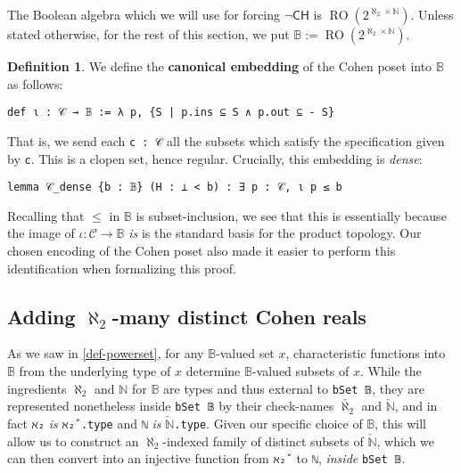 \documentclass[a4paper,USenglish,cleveref, autoref]{lipics-v2019}
\newcommand{\B}{\mathbb{B}}
\newcommand{\lil}{\lstinline}
\newcommand{\N}{\mathbb{N}}
\theoremstyle{definition}
\newtheorem{defn}[theorem]{Definition}
\begin{document}
The Boolean algebra which we will use for forcing $\neg\mathsf{CH}$ is $\operatorname{RO}(2^{\aleph_2 \times \mathbb{N}})$. Unless stated otherwise, for the rest of this section, we put $\B := \operatorname{RO}(2^{\aleph_2 \times \mathbb{N}})$.

\begin{defn}
  We define the \textbf{canonical embedding} of the Cohen poset into $\B$ as follows:
  \begin{lstlisting}
def ι : 𝒞 → 𝔹 := λ p, {S | p.ins ⊆ S ∧ p.out ⊆ - S}    
\end{lstlisting}
\end{defn}
That is, we send each \lil{c : 𝒞} all the subsets which satisfy the specification given by \lil{c}. This is a clopen set, hence regular. Crucially, this embedding is \emph{dense}:
\begin{lstlisting}
lemma 𝒞_dense {b : 𝔹} (H : ⊥ < b) : ∃ p : 𝒞, ι p ≤ b  
\end{lstlisting}
Recalling that $\leq$ in $\B$ is subset-inclusion, we see that this is essentially because the image of $\iota : \mathcal{C} \to \B$ \emph{is} is the standard basis for the product topology. Our chosen encoding of the Cohen poset also made it easier to perform this identification when formalizing this proof.
\subsection{Adding $\aleph_2$-many distinct Cohen reals} \label{subsect:cohen-reals}
As we saw in \autoref{def-powerset}, for any $\B$-valued set $x$, characteristic functions into $\B$ from the underlying type of $x$ determine $\B$-valued subsets of $x$. While the ingredients $\aleph_2$ and $\mathbb{N}$ for $\B$ are types and thus external to \lil{bSet 𝔹}, they are represented nonetheless inside \lil{bSet 𝔹} by their check-names $\check{\aleph_2}$ and $\check{\mathbb{N}}$, and in fact \lil{ℵ₂} \emph{is} \lil{ℵ₂̌ .type} and \lil{ℕ} \emph{is} $\check{\mathbb{N}}$\lil{.type}. Given our specific choice of $\B$, this will allow us to construct an $\aleph_2$-indexed family of distinct subsets of $\check{\N}$, which we can then convert into an injective function from \lil{ℵ₂̌ } to \lil{ℕ}, \emph{inside} \lil{bSet 𝔹}.
\end{document}
